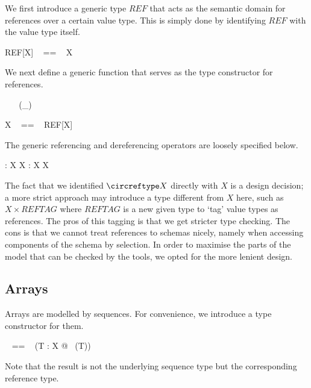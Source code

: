 We first introduce a generic type $REF$ that acts as the semantic domain for references over a certain value type. This is simply done by identifying $REF$ with the value type itself.%
%
\begin{circusflow}
%
\begin{zed}
  REF[X] ~ == ~ X
\end{zed}
\end{circusflow}

\nid We next define a generic function that serves as the type constructor for references.
%
\begin{circusflow}
\begin{zed}
  \generic ~ ~ (\circreftype \_)
\end{zed}
%
\begin{zed}
  \circreftype X ~ == ~ REF[X]
\end{zed}
\end{circusflow}

\nid The generic referencing and dereferencing operators are loosely specified below.
%
\begin{gendef}[X]
  \circref : X \fun \circreftype X
  \also
  \circderef : \circreftype X \fun X
\end{gendef}
%
The fact that we identified $\circreftype X$ directly with $X$ is a design decision; a more strict approach may introduce a type different from $X$ here, such as $X \times REFTAG$ where $REFTAG$ is a new given type to `tag' value types as references. The pros of this tagging is that we get stricter type checking. The cons is that we cannot treat references to schemas nicely, namely when accessing components of the schema by selection. In order to maximise the parts of the model that can be checked by the tools, we opted for the more lenient design.

\subsection{Arrays}


Arrays are modelled by sequences. For convenience, we introduce a type constructor for them.
%
\begin{zed}
  \circarray[X] ~ == ~ (\lambda T : \power X @ \circreftype~(\seq T))
\end{zed}
%
Note that the result is not the underlying sequence type but the corresponding reference type.

